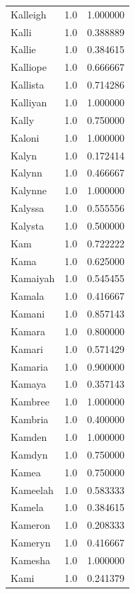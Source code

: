 \documentclass[
  letterpaper,
  DIV=11,
  numbers=noendperiod]{scrreprt}
\begin{document}
\begin{tabular}{lrr}
Kalleigh        &   1.0 &   1.000000 \\
Kalli           &   1.0 &   0.388889 \\
Kallie          &   1.0 &   0.384615 \\
Kalliope        &   1.0 &   0.666667 \\
Kallista        &   1.0 &   0.714286 \\
Kalliyan        &   1.0 &   1.000000 \\
Kally           &   1.0 &   0.750000 \\
Kaloni          &   1.0 &   1.000000 \\
Kalyn           &   1.0 &   0.172414 \\
Kalynn          &   1.0 &   0.466667 \\
Kalynne         &   1.0 &   1.000000 \\
Kalyssa         &   1.0 &   0.555556 \\
Kalysta         &   1.0 &   0.500000 \\
Kam             &   1.0 &   0.722222 \\
Kama            &   1.0 &   0.625000 \\
Kamaiyah        &   1.0 &   0.545455 \\
Kamala          &   1.0 &   0.416667 \\
Kamani          &   1.0 &   0.857143 \\
Kamara          &   1.0 &   0.800000 \\
Kamari          &   1.0 &   0.571429 \\
Kamaria         &   1.0 &   0.900000 \\
Kamaya          &   1.0 &   0.357143 \\
Kambree         &   1.0 &   1.000000 \\
Kambria         &   1.0 &   0.400000 \\
Kamden          &   1.0 &   1.000000 \\
Kamdyn          &   1.0 &   0.750000 \\
Kamea           &   1.0 &   0.750000 \\
Kameelah        &   1.0 &   0.583333 \\
Kamela          &   1.0 &   0.384615 \\
Kameron         &   1.0 &   0.208333 \\
Kameryn         &   1.0 &   0.416667 \\
Kamesha         &   1.0 &   1.000000 \\
Kami            &   1.0 &   0.241379 \\

\end{tabular}
\end{document}

